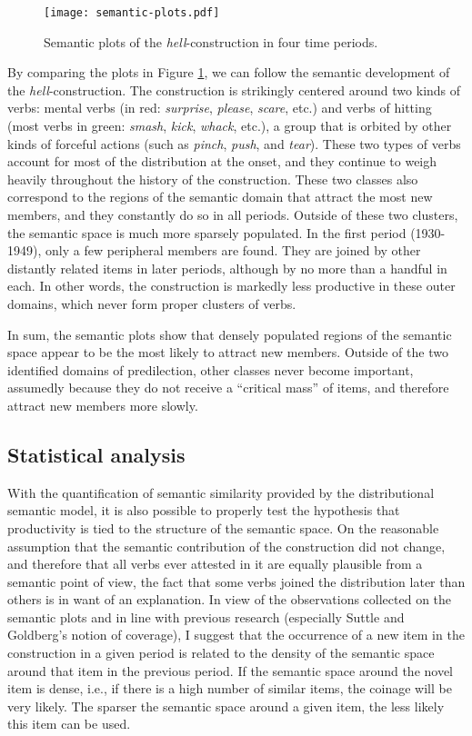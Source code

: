 \documentclass[11pt]{article}
\begin{document}
\begin{figure}
\centering
\texttt{[image: semantic-plots.pdf]}
\caption{Semantic plots of the \textit{hell}-construction in four time periods.}\label{plots}
\end{figure}

By comparing the plots in Figure \ref{plots}, we can follow the semantic development of the \textit{hell}-construction. The construction is strikingly centered around two kinds of verbs: mental verbs (in red: \textit{surprise}, \textit{please}, \textit{scare}, etc.) and verbs of hitting (most verbs in green: \textit{smash}, \textit{kick}, \textit{whack}, etc.), a group that is orbited by other kinds of forceful actions (such as \textit{pinch}, \textit{push}, and \textit{tear}). These two types of verbs account for most of the distribution at the onset, and they continue to weigh heavily throughout the history of the construction. These two classes also correspond to the regions of the semantic domain that attract the most new members, and they constantly do so in all periods. Outside of these two clusters, the semantic space is much more sparsely populated. In the first period (1930-1949), only a few peripheral members are found. They are joined by other distantly related items in later periods, although by no more than a handful in each. In other words, the construction is markedly less productive in these outer domains, which never form proper clusters of verbs.

In sum, the semantic plots show that densely populated regions of the semantic space appear to be the most likely to attract new members. Outside of the two identified domains of predilection, other classes never become important, assumedly because they do not receive a ``critical mass'' of items, and therefore attract new members more slowly.

\subsection{Statistical analysis}

With the quantification of semantic similarity provided by the distributional semantic model, it is also possible to properly test the hypothesis that productivity is tied to the structure of the semantic space. On the reasonable assumption that the semantic contribution of the construction did not change, and therefore that all verbs ever attested in it are equally plausible from a semantic point of view, the fact that some verbs joined the distribution later than others is in want of an explanation. In view of the observations collected on the semantic plots and in line with previous research (especially Suttle and Goldberg's notion of coverage), I suggest that the occurrence of a new item in the construction in a given period is related to the density of the semantic space around that item in the previous period. If the semantic space around the novel item is dense, i.e., if there is a high number of similar items, the coinage will be very likely. The sparser the semantic space around a given item, the less likely this item can be used.
\end{document}
